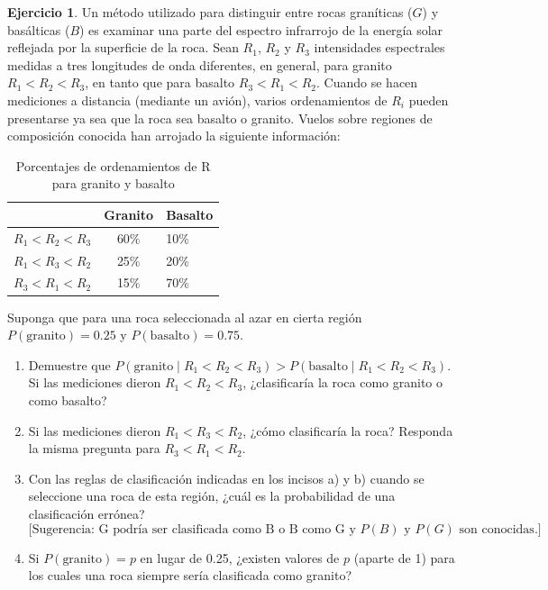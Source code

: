 \documentclass[
  11pt,
]{book}
\newcommand{\lt}{<}
\theoremstyle{definition}
\theoremstyle{definition}
\theoremstyle{definition}
\newtheorem{exercise}{Ejercicio}[chapter]
\theoremstyle{definition}
\theoremstyle{remark}
\begin{document}
\begin{exercise}

Un método utilizado para distinguir entre rocas graníticas (\(G\)) y basálticas (\(B\)) es examinar una parte del espectro infrarrojo de la energía solar reflejada por la superficie de la roca. Sean \(R_1\), \(R_2\) y \(R_3\) intensidades espectrales medidas a tres longitudes de onda diferentes, en general, para granito \(R_1 < R_2 < R_3\), en tanto que para basalto \(R_3 < R_1 < R_2\). Cuando se hacen mediciones a distancia (mediante un avión), varios ordenamientos de \(R_i\) pueden presentarse ya sea que la roca sea basalto o granito. Vuelos sobre regiones de composición conocida han arrojado la siguiente información:

\begin{table}[H]
\centering
\caption{\label{tab:unnamed-chunk-26}Porcentajes de ordenamientos de R para granito y basalto}
\centering
\begin{tabular}[t]{lcl}
\toprule
\textbf{} & \textbf{Granito} & \textbf{Basalto}\\
\midrule
$R_1 \lt  R_2 \lt  R_3$ & 60\% & 10\%\\
$R_1 \lt  R_3 \lt  R_2$ & 25\% & 20\%\\
$R_3 \lt  R_1 \lt  R_2$ & 15\% & 70\%\\
\bottomrule
\end{tabular}
\end{table}

Suponga que para una roca seleccionada al azar en cierta región \(P(\text{granito}) = 0.25\) y \(P(\text{basalto}) = 0.75\).

\begin{enumerate}
\def\labelenumi{\alph{enumi}.}
\item
  Demuestre que \(P(\text{granito} \mid R_1 < R_2 < R_3) > P(\text{basalto} \mid R_1 < R_2 < R_3)\). Si las mediciones dieron \(R_1 < R_2 < R_3\), ¿clasificaría la roca como granito o como basalto?
\item
  Si las mediciones dieron \(R_1 < R_3 < R_2\), ¿cómo clasificaría la roca? Responda la misma pregunta para \(R_3 < R_1 < R_2\).
\item
  Con las reglas de clasificación indicadas en los incisos a) y b) cuando se seleccione una roca de esta región, ¿cuál es la probabilidad de una clasificación errónea?\\
  \[ \text{[Sugerencia: G podría ser clasificada como B o B como G y } P(B) \text{ y } P(G) \text{ son conocidas.]} \]
\item
  Si \(P(\text{granito}) = p\) en lugar de 0.25, ¿existen valores de \(p\) (aparte de 1) para los cuales una roca siempre sería clasificada como granito?
\end{enumerate}

\end{exercise}
\end{document}
